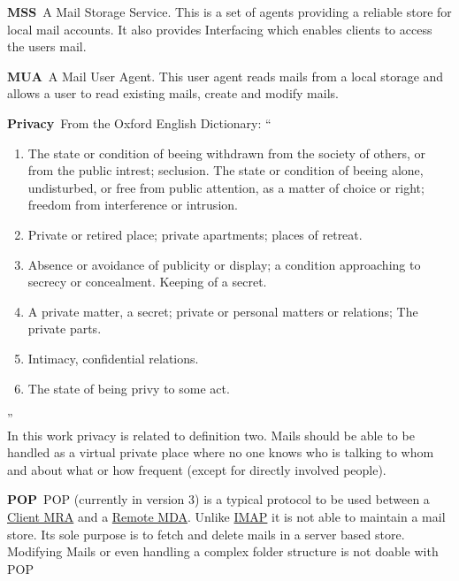 \documentclass[10pt,a4paper,appendixprefix,pdfusetitle,twocolumn,draft]{scrbook}
\newenvironment{entry}{\par\leavevmode\hangpara{1.5mm}{1}\ignorespaces}{\RaggedRight\par}
\newcommand*{\mainentry}[2]{{\bfseries{#1\label{def:#1}}}~#2\par}
\newcommand*{\defref}[1]{\hyperref[def:#1]{#1}}
\begin{document}
\begin{entry}
  \mainentry{MSS}{A Mail Storage Service. This is a set of agents providing a reliable store for local mail accounts. It also provides Interfacing which enables clients to access the users mail.}
\end{entry}

\begin{entry}
  \mainentry{MUA}{A Mail User Agent. This user agent reads mails from a local storage and allows a user to read existing mails, create and modify mails.}
\end{entry}

\begin{entry}
  \mainentry{Privacy}{From the Oxford English Dictionary: ``
    \begin{enumerate}
      \item The state or condition of beeing withdrawn from the society of others, or from the public intrest; seclusion. The state or condition of beeing alone, undisturbed, or free from public attention, as a matter of choice or right; freedom from interference or intrusion.
      \item Private or retired place; private apartments; places of retreat.
      \item Absence or avoidance of publicity or display; a condition approaching to secrecy or concealment. Keeping of a secret.
      \item A private matter, a secret; private or personal matters or relations; The private parts.
      \item Intimacy, confidential relations.
      \item The state of being privy to some act.
    \end{enumerate}''\cite[FIXME]{OXFORD}\\
    In this work privacy is related to definition two. Mails should be able to be handled as a virtual private place where no one knows who is talking to whom and about what or how frequent (except for directly involved people).
  }
\end{entry}

\begin{entry}
  \mainentry{POP}{POP (currently in version 3) is a typical protocol to be used between a \defref{Client MRA} and a \defref{Remote MDA}. Unlike \defref{IMAP} it is not able to maintain a mail store. Its sole purpose is to fetch and delete mails in a server based store. Modifying Mails or even handling a complex folder structure is not doable with POP}
\end{entry}
\end{document}
